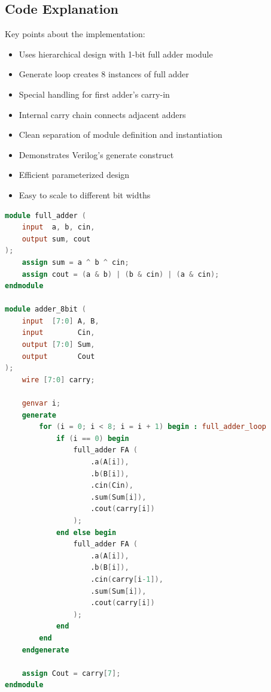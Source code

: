 \documentclass{article}
\begin{document}
\subsection{Code Explanation}
Key points about the implementation:
\begin{itemize}
    \item Uses hierarchical design with 1-bit full adder module
    \item Generate loop creates 8 instances of full adder
    \item Special handling for first adder's carry-in
    \item Internal carry chain connects adjacent adders
    \item Clean separation of module definition and instantiation
    \item Demonstrates Verilog's generate construct
    \item Efficient parameterized design
    \item Easy to scale to different bit widths
\end{itemize}

\begin{tcolorbox}[title=8-bit Adder Module Code, breakable]
\begin{lstlisting}[language=Verilog]
module full_adder (
    input  a, b, cin,
    output sum, cout
);
    assign sum = a ^ b ^ cin;
    assign cout = (a & b) | (b & cin) | (a & cin);
endmodule

module adder_8bit (
    input  [7:0] A, B,
    input        Cin,
    output [7:0] Sum,
    output       Cout
);
    wire [7:0] carry;
    
    genvar i;
    generate
        for (i = 0; i < 8; i = i + 1) begin : full_adder_loop
            if (i == 0) begin
                full_adder FA (
                    .a(A[i]),
                    .b(B[i]),
                    .cin(Cin),
                    .sum(Sum[i]),
                    .cout(carry[i])
                );
            end else begin
                full_adder FA (
                    .a(A[i]),
                    .b(B[i]),
                    .cin(carry[i-1]),
                    .sum(Sum[i]),
                    .cout(carry[i])
                );
            end
        end
    endgenerate
    
    assign Cout = carry[7];
endmodule
\end{lstlisting}
\end{tcolorbox}
\end{document}

